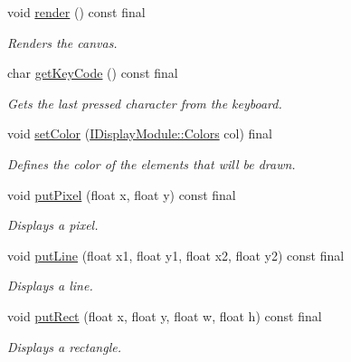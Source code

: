 \begin{DoxyCompactItemize}
\mbox{\label{classArcade_1_1Display_1_1Libcaca_ae41aaff01de7010cab07d8eecf5b292a}} 
void \mbox{\hyperlink{classArcade_1_1Display_1_1Libcaca_ae41aaff01de7010cab07d8eecf5b292a}{render}} () const final
\begin{DoxyCompactList}\small\item\em Renders the canvas. \end{DoxyCompactList}\item 
char \mbox{\hyperlink{classArcade_1_1Display_1_1Libcaca_a741fdec5c2e77cc7959e5f3444f8c8ac}{get\+Key\+Code}} () const final
\begin{DoxyCompactList}\small\item\em Gets the last pressed character from the keyboard. \end{DoxyCompactList}\item 
void \mbox{\hyperlink{classArcade_1_1Display_1_1Libcaca_aec7af72c1ffd1a3af05b4d8cf3edf84e}{set\+Color}} (\mbox{\hyperlink{classArcade_1_1Display_1_1IDisplayModule_ae0a776be9163d096051c522e21c007b2}{I\+Display\+Module\+::\+Colors}} col) final
\begin{DoxyCompactList}\small\item\em Defines the color of the elements that will be drawn. \end{DoxyCompactList}\item 
void \mbox{\hyperlink{classArcade_1_1Display_1_1Libcaca_a857080fd758f300ef2b05563d5814a1f}{put\+Pixel}} (float x, float y) const final
\begin{DoxyCompactList}\small\item\em Displays a pixel. \end{DoxyCompactList}\item 
void \mbox{\hyperlink{classArcade_1_1Display_1_1Libcaca_ab3dfb33242807ae65707f8396db171cf}{put\+Line}} (float x1, float y1, float x2, float y2) const final
\begin{DoxyCompactList}\small\item\em Displays a line. \end{DoxyCompactList}\item 
void \mbox{\hyperlink{classArcade_1_1Display_1_1Libcaca_a740ea092d0df2e07478fafb6bff8122a}{put\+Rect}} (float x, float y, float w, float h) const final
\begin{DoxyCompactList}\small\item\em Displays a rectangle. \end{DoxyCompactList}\item 

\end{DoxyCompactItemize}
